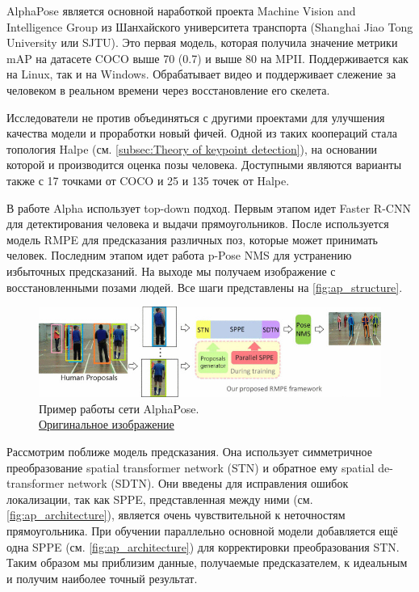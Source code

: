 AlphaPose является основной наработкой проекта Machine Vision and Intelligence Group из Шанхайского университета транспорта (Shanghai Jiao Tong University или SJTU). Это первая модель, которая получила значение метрики mAP на датасете COCO выше 70 (0.7) и выше 80 на MPII. Поддерживается как на Linux, так и на Windows. Обрабатывает видео и поддерживает слежение за человеком в реальном времени через восстановление его скелета.

Исследователи не против объединяться с другими проектами для улучшения качества модели и проработки новый фичей. Одной из таких коопераций стала топология Halpe (см. \autoref{subsec:Theory of keypoint detection}), на основании которой и производится оценка позы человека. Доступными являются варианты также с 17 точками от COCO и 25 и 135 точек от Halpe.

В работе Alpha использует top-down подход. Первым этапом идет Faster R-CNN для детектирования человека и выдачи прямоугольников. После используется модель RMPE для предсказания различных поз, которые может принимать  человек. Последним этапом идет работа p-Pose NMS для устранению избыточных предсказаний. На выходе мы получаем изображение с восстановленными позами людей. Все шаги представлены на \autoref{fig:ap_structure}. \cite{fang2017rmpe}

\begin{figure}[h]
	\centering
	\includegraphics[width=\textwidth]{./images/AlphaPose_structure}
	\caption{Пример работы сети AlphaPose.\\ \href{https://ieeexplore.ieee.org/mediastore_new/IEEE/content/media/8234942/8237262/8237518/8237518-fig-3-source-large.gif}{Оригинальное изображение}}
	\label{fig:ap_structure}
\end{figure}

Рассмотрим поближе модель предсказания. Она использует симметричное преобразование spatial transformer network (STN) и обратное ему spatial de-transformer network (SDTN). Они введены для исправления ошибок локализации, так как SPPE, представленная между ними (см. \autoref{fig:ap_architecture}), является очень чувствительной к неточностям прямоугольника. При обучении параллельно основной модели добавляется ещё одна SPPE (см. \autoref{fig:ap_architecture}) для корректировки преобразования STN. Таким образом мы приблизим данные, получаемые предсказателем, к идеальным и получим наиболее точный результат.

